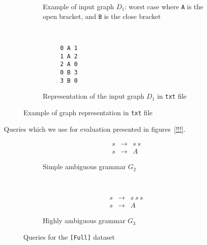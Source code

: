 \begin{figure}[h]
    \centering
    \begin{subfigure}[b]{0.24\textwidth}
        \centering

        \caption{Example of input graph $D_1$: worst case where \texttt{A} is the open bracket, and \texttt{B} is the close bracket}
        \label{fig:worstCaseGraph}
    \end{subfigure}%
    ~
    \begin{subfigure}[b]{0.24\textwidth}
        \centering
         \begin{verbatim}
     0 A 1
     1 A 2
     2 A 0
     0 B 3
     3 B 0
 \end{verbatim}

        \caption{Representation of the input graph $D_1$ in \texttt{txt} file}
    \end{subfigure}
    \caption{Example of graph representation in \texttt{txt} file}
    \label{fig:graph_example}
\end{figure}

Queries which we use for evaluation presented in figures~\ref{!!!}.


\begin{figure}[h]
    \centering
    \begin{subfigure}[b]{0.24\textwidth}
        \centering
        \[
         \begin{array}{rcl}
           s & \rightarrow & s \ s \\
           s & \rightarrow & A
         \end{array}
         \]
        \caption{Simple ambiguous grammar $G_2$}
    \end{subfigure}%
    ~
    \begin{subfigure}[b]{0.24\textwidth}
        \centering
        \[
         \begin{array}{rcl}
           s & \rightarrow & s \ s \ s \\
           s & \rightarrow & A
         \end{array}
         \]
        \caption{Highly ambiguous grammar $G_3$}
    \end{subfigure}
    \caption{Queries for the \texttt{[Full]} dataset}
    \label{fig:grammar_full}
\end{figure}

